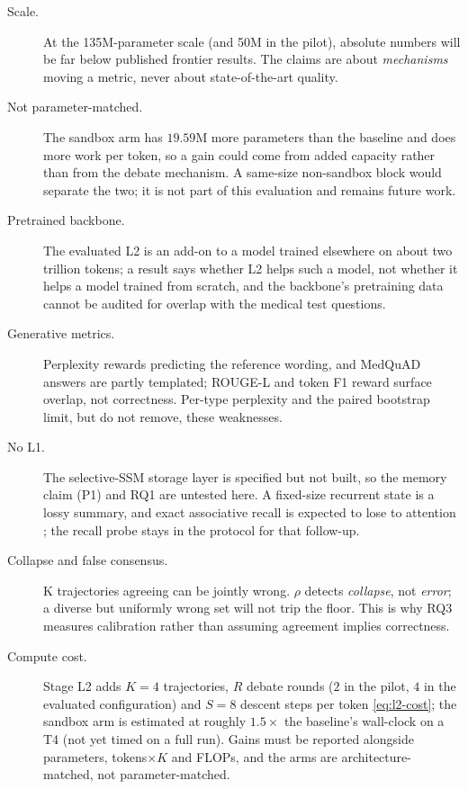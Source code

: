 \documentclass[11pt,a4paper]{article}
\newcommand{\rhodim}{\rho}
\theoremstyle{plain}
\theoremstyle{definition}
\theoremstyle{remark}
\begin{document}
\begin{description}
  \item[Scale.] At the 135M-parameter scale (and 50M in the pilot), absolute
    numbers will be far below published frontier results. The claims are about
    \emph{mechanisms} moving a metric, never about state-of-the-art quality.
  \item[Not parameter-matched.] The sandbox arm has $19.59$M more
    parameters than the baseline and does more work per token, so a gain could
    come from added capacity rather than from the debate mechanism. A
    same-size non-sandbox block would separate the two; it is not part of this
    evaluation and remains future work.
  \item[Pretrained backbone.] The evaluated L2 is an add-on to a model trained
    elsewhere on about two trillion tokens; a result says whether L2 helps
    such a model, not whether it helps a model trained from scratch, and the
    backbone's pretraining data cannot be audited for overlap with the medical
    test questions.
  \item[Generative metrics.] Perplexity rewards predicting the reference
    wording, and MedQuAD answers are partly templated; ROUGE-L and token F1
    reward surface overlap, not correctness. Per-type perplexity and the
    paired bootstrap limit, but do not remove, these weaknesses.
  \item[No L1.] The selective-SSM storage layer is specified but not
    built, so the memory claim (P1) and RQ1 are untested here. A fixed-size
    recurrent state is a lossy summary, and exact associative recall is
    expected to lose to attention \cite{lieber2024jamba}; the recall probe
    stays in the protocol for that follow-up.
  \item[Collapse and false consensus.] K trajectories agreeing can be jointly
    wrong. $\rhodim$ detects \emph{collapse}, not \emph{error}; a diverse but
    uniformly wrong set will not trip the floor. This is why RQ3 measures
    calibration rather than assuming agreement implies correctness.
  \item[Compute cost.] Stage L2 adds $K{=}4$ trajectories, $R$ debate
    rounds ($2$ in the pilot, $4$ in the evaluated configuration) and $S{=}8$
    descent steps per token \eqref{eq:l2-cost}; the
    sandbox arm is estimated at roughly $1.5\times$ the baseline's wall-clock
    on a T4 (not yet timed on a full run). Gains must be reported alongside parameters, tokens$\times K$ and
    FLOPs, and the arms are architecture-matched, not parameter-matched.

\end{description}
\end{document}
